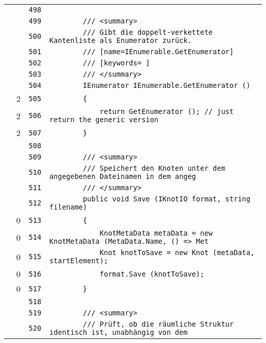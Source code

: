 \documentclass[a4paper,10pt]{article}
\begin{document}
\begin{longtable}[l]{lrrl}
\cellcolor{gray} &  & \verb~498~ & \verb~~\\
\cellcolor{gray} &  & \verb~499~ & \verb~        /// <summary>~\\
\cellcolor{gray} &  & \verb~500~ & \verb~        /// Gibt die doppelt-verkettete Kantenliste als Enumerator zurück.~\\
\cellcolor{gray} &  & \verb~501~ & \verb~        /// [name=IEnumerable.GetEnumerator]~\\
\cellcolor{gray} &  & \verb~502~ & \verb~        /// [keywords= ]~\\
\cellcolor{gray} &  & \verb~503~ & \verb~        /// </summary>~\\
\cellcolor{gray} &  & \verb~504~ & \verb~        IEnumerator IEnumerable.GetEnumerator ()~\\
\cellcolor{green} & 2 & \verb~505~ & \verb~        {~\\
\cellcolor{green} & 2 & \verb~506~ & \verb~            return GetEnumerator (); // just return the generic version~\\
\cellcolor{green} & 2 & \verb~507~ & \verb~        }~\\
\cellcolor{gray} &  & \verb~508~ & \verb~~\\
\cellcolor{gray} &  & \verb~509~ & \verb~        /// <summary>~\\
\cellcolor{gray} &  & \verb~510~ & \verb~        /// Speichert den Knoten unter dem angegebenen Dateinamen in dem angeg~\\
\cellcolor{gray} &  & \verb~511~ & \verb~        /// </summary>~\\
\cellcolor{gray} &  & \verb~512~ & \verb~        public void Save (IKnotIO format, string filename)~\\
\cellcolor{red} & 0 & \verb~513~ & \verb~        {~\\
\cellcolor{red} & 0 & \verb~514~ & \verb~            KnotMetaData metaData = new KnotMetaData (MetaData.Name, () => Met~\\
\cellcolor{red} & 0 & \verb~515~ & \verb~            Knot knotToSave = new Knot (metaData, startElement);~\\
\cellcolor{red} & 0 & \verb~516~ & \verb~            format.Save (knotToSave);~\\
\cellcolor{red} & 0 & \verb~517~ & \verb~        }~\\
\cellcolor{gray} &  & \verb~518~ & \verb~~\\
\cellcolor{gray} &  & \verb~519~ & \verb~        /// <summary>~\\
\cellcolor{gray} &  & \verb~520~ & \verb~        /// Prüft, ob die räumliche Struktur identisch ist, unabhängig von dem~\\

\end{longtable}
\end{document}
